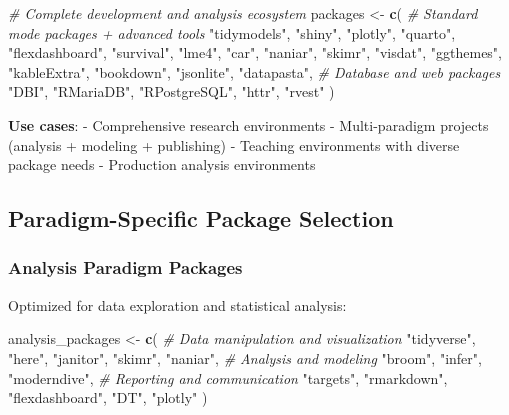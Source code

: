 \documentclass[
]{article}
\newenvironment{Shaded}{\begin{snugshade}}{\end{snugshade}}
\newcommand{\CommentTok}[1]{\textcolor[rgb]{0.56,0.35,0.01}{\textit{#1}}}
\newcommand{\FunctionTok}[1]{\textcolor[rgb]{0.13,0.29,0.53}{\textbf{#1}}}
\newcommand{\NormalTok}[1]{#1}
\newcommand{\OtherTok}[1]{\textcolor[rgb]{0.56,0.35,0.01}{#1}}
\newcommand{\StringTok}[1]{\textcolor[rgb]{0.31,0.60,0.02}{#1}}
\begin{document}
\begin{Shaded}
\begin{Highlighting}[]
\CommentTok{\# Complete development and analysis ecosystem}
\NormalTok{packages }\OtherTok{\textless{}{-}} \FunctionTok{c}\NormalTok{(}
  \CommentTok{\# Standard mode packages + advanced tools}
  \StringTok{"tidymodels"}\NormalTok{, }\StringTok{"shiny"}\NormalTok{, }\StringTok{"plotly"}\NormalTok{, }\StringTok{"quarto"}\NormalTok{,}
  \StringTok{"flexdashboard"}\NormalTok{, }\StringTok{"survival"}\NormalTok{, }\StringTok{"lme4"}\NormalTok{, }\StringTok{"car"}\NormalTok{,}
  \StringTok{"naniar"}\NormalTok{, }\StringTok{"skimr"}\NormalTok{, }\StringTok{"visdat"}\NormalTok{, }\StringTok{"ggthemes"}\NormalTok{,}
  \StringTok{"kableExtra"}\NormalTok{, }\StringTok{"bookdown"}\NormalTok{, }\StringTok{"jsonlite"}\NormalTok{, }\StringTok{"datapasta"}\NormalTok{,}
  \CommentTok{\# Database and web packages}
  \StringTok{"DBI"}\NormalTok{, }\StringTok{"RMariaDB"}\NormalTok{, }\StringTok{"RPostgreSQL"}\NormalTok{, }\StringTok{"httr"}\NormalTok{, }\StringTok{"rvest"}
\NormalTok{)}
\end{Highlighting}
\end{Shaded}

\textbf{Use cases}: - Comprehensive research environments -
Multi-paradigm projects (analysis + modeling + publishing) - Teaching
environments with diverse package needs - Production analysis
environments

\subsection{Paradigm-Specific Package
Selection}\label{paradigm-specific-package-selection}

\subsubsection{Analysis Paradigm
Packages}\label{analysis-paradigm-packages}

Optimized for data exploration and statistical analysis:

\begin{Shaded}
\begin{Highlighting}[]
\NormalTok{analysis\_packages }\OtherTok{\textless{}{-}} \FunctionTok{c}\NormalTok{(}
  \CommentTok{\# Data manipulation and visualization}
  \StringTok{"tidyverse"}\NormalTok{, }\StringTok{"here"}\NormalTok{, }\StringTok{"janitor"}\NormalTok{, }\StringTok{"skimr"}\NormalTok{, }\StringTok{"naniar"}\NormalTok{,}
  \CommentTok{\# Analysis and modeling}
  \StringTok{"broom"}\NormalTok{, }\StringTok{"infer"}\NormalTok{, }\StringTok{"moderndive"}\NormalTok{,}
  \CommentTok{\# Reporting and communication}
  \StringTok{"targets"}\NormalTok{, }\StringTok{"rmarkdown"}\NormalTok{, }\StringTok{"flexdashboard"}\NormalTok{, }\StringTok{"DT"}\NormalTok{, }\StringTok{"plotly"}
\NormalTok{)}
\end{Highlighting}
\end{Shaded}
\end{document}
